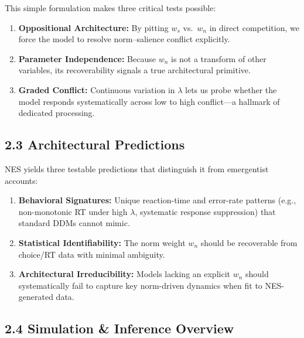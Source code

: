 \documentclass[
  11pt,
]{article}
\providecommand{\tightlist}{%
  \setlength{\itemsep}{0pt}\setlength{\parskip}{0pt}}
\begin{document}
This simple formulation makes three critical tests possible:

\begin{enumerate}
\def\labelenumi{\arabic{enumi}.}
\tightlist
\item
  \textbf{Oppositional Architecture:} By pitting \(w_s\) vs.~\(w_n\) in
  direct competition, we force the model to resolve norm--salience
  conflict explicitly.\\
\item
  \textbf{Parameter Independence:} Because \(w_n\) is not a transform of
  other variables, its recoverability signals a true architectural
  primitive.\\
\item
  \textbf{Graded Conflict:} Continuous variation in \(\lambda\) lets us
  probe whether the model responds systematically across low to high
  conflict---a hallmark of dedicated processing.
\end{enumerate}

\subsection{2.3 Architectural
Predictions}\label{architectural-predictions}

NES yields three testable predictions that distinguish it from
emergentist accounts:

\begin{enumerate}
\def\labelenumi{\arabic{enumi}.}
\tightlist
\item
  \textbf{Behavioral Signatures:} Unique reaction-time and error-rate
  patterns (e.g., non-monotonic RT under high \(\lambda\), systematic
  response suppression) that standard DDMs cannot mimic.\\
\item
  \textbf{Statistical Identifiability:} The norm weight \(w_n\) should
  be recoverable from choice/RT data with minimal ambiguity.\\
\item
  \textbf{Architectural Irreducibility:} Models lacking an explicit
  \(w_n\) should systematically fail to capture key norm-driven dynamics
  when fit to NES-generated data.
\end{enumerate}

\subsection{2.4 Simulation \& Inference
Overview}\label{simulation-inference-overview}
\end{document}
